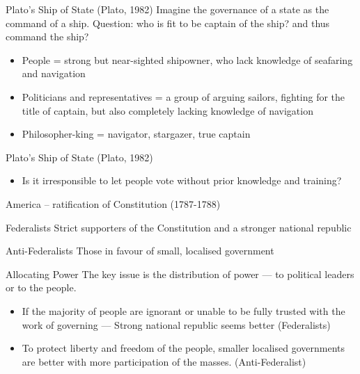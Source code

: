 \documentclass{beamer}
\begin{document}

\begin{frame}{Plato’s Ship of State (Plato, 1982)}
Imagine the governance of a state as the command of a ship.
Question: who is fit to be captain of the ship? and thus command the ship?
\begin{itemize}
    \item People = strong but near-sighted shipowner, who lack knowledge of seafaring and navigation
    \item Politicians and representatives = a group of arguing sailors, fighting for the title of captain, but also completely lacking knowledge of navigation
    \item Philosopher-king = navigator, stargazer, true captain
\end{itemize}
\end{frame}

\begin{frame}{Plato’s Ship of State (Plato, 1982)}
\begin{itemize}
    \item Is it irresponsible to let people vote without prior knowledge and training?
\end{itemize}

\end{frame}


\begin{frame}{America –  ratification of Constitution (1787-1788)}
\begin{block}{Federalists}
Strict supporters of the Constitution and a stronger national republic
\end{block}

\begin{block}{Anti-Federalists}
Those in favour of small, localised government
\end{block}

\end{frame}



\begin{frame}{Allocating Power}
The key issue is the distribution of power — to political leaders or to the people.
\begin{itemize}
    \item If the majority of people are ignorant or unable to be fully trusted with the work of governing — Strong national republic seems better (Federalists)
    \item To protect liberty and freedom of the people, smaller localised governments are better with more participation of the masses.  (Anti-Federalist)
\end{itemize}

\end{frame}
\end{document}

